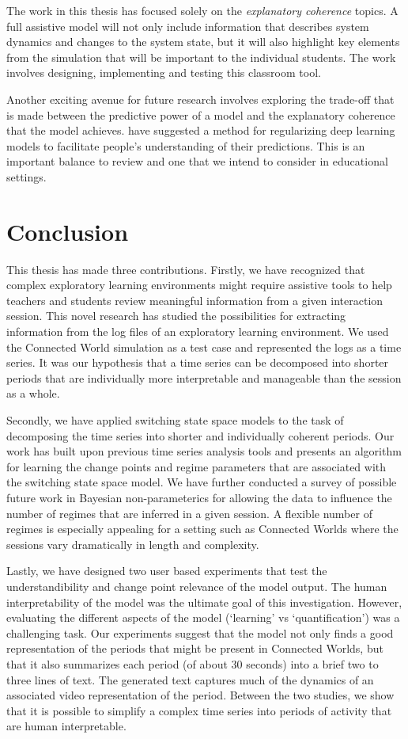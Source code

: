 The work in this thesis has focused solely on the \textit{explanatory coherence} topics. A full assistive model will not only include information that describes system dynamics and changes to the system state, but it will also highlight key elements from the simulation that will be important to the individual students. The work involves designing, implementing and testing this classroom tool.

Another exciting avenue for future research involves exploring the trade-off that is made between the predictive power of a model and the explanatory coherence that the model achieves. \cite{wu2017beyond} have suggested a method for regularizing deep learning models to facilitate people's understanding of their predictions. This is an important balance to review and one that we intend to consider in educational settings.

\section{Conclusion}

This thesis has made three contributions. Firstly, we have recognized that complex exploratory learning environments might require assistive tools to help teachers and students review meaningful information from a given interaction session. This novel research has studied the possibilities for extracting information from the log files of an exploratory learning environment. We used the Connected World simulation as a test case and represented the logs as a time series. It was our hypothesis that a time series can be decomposed into shorter periods that are individually more interpretable and manageable than the session as a whole.

Secondly, we have applied switching state space models to the task of decomposing the time series into shorter and individually coherent periods. Our work has built upon previous time series analysis tools and presents an algorithm for learning the change points and regime parameters that are associated with the switching state space model. We have further conducted a survey of possible future work in Bayesian non-parameterics for allowing the data to influence the number of regimes that are inferred in a given session. A flexible number of regimes is especially appealing for a setting such as Connected Worlds where the sessions vary dramatically in length and complexity.

Lastly, we have designed two user based experiments that test the understandibility and change point relevance of the model output. The human interpretability of the model was the ultimate goal of this investigation. However, evaluating the different aspects of the model (`learning' vs `quantification') was a challenging task. Our experiments suggest that the model not only finds a good representation of the periods that might be present in Connected Worlds, but that it also summarizes each period (of about 30 seconds) into a brief two to three lines of text. The generated text captures much of the dynamics of an associated video representation of the period. Between the two studies, we show that it is possible to simplify a complex time series into periods of activity that are human interpretable.

